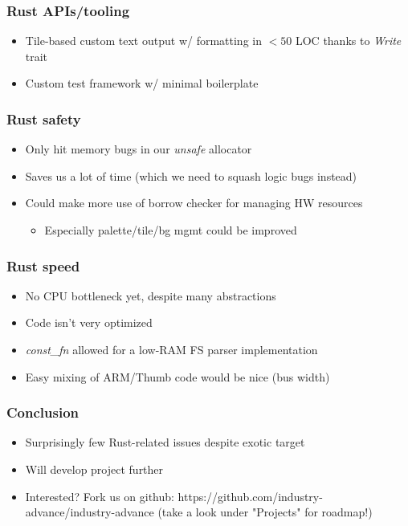 \documentclass{beamer}
\begin{document}
\begin{frame}
	\frametitle{Rust APIs/tooling}
	\begin{itemize}
		\item Tile-based custom text output w/ formatting in $<50$ LOC thanks to \emph{Write} trait
		\item Custom test framework w/ minimal boilerplate
	\end{itemize}
\end{frame}

\begin{frame}
	\frametitle{Rust safety}
	\begin{itemize}
		\item Only hit memory bugs in our \emph{unsafe} allocator
		\item Saves us a lot of time (which we need to squash logic bugs instead)
		\item Could make more use of borrow checker for managing HW resources \begin{itemize}
			      \item Especially palette/tile/bg mgmt could be improved
		      \end{itemize}
	\end{itemize}
\end{frame}

\begin{frame}
	\frametitle{Rust speed}
	\begin{itemize}
		\item No CPU bottleneck yet, despite many abstractions
		\item Code isn't very optimized
		\item \emph{const\_fn} allowed for a low-RAM FS parser implementation
		\item Easy mixing of ARM/Thumb code would be nice (bus width)
	\end{itemize}
\end{frame}

\begin{frame}
	\frametitle{Conclusion}
	\begin{itemize}
		\item Surprisingly few Rust-related issues despite exotic target
		\item Will develop project further
		\item Interested? Fork us on github: https://github.com/industry-advance/industry-advance (take a look under "Projects" for roadmap!)
	\end{itemize}
\end{frame}
\end{document}
